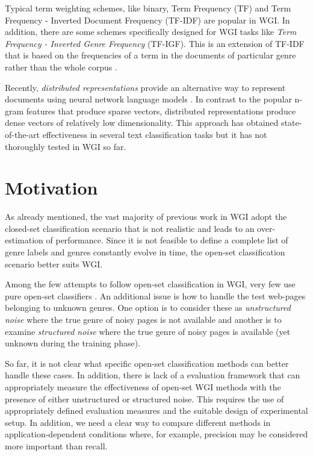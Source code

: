 \begin{itemize}
Typical term weighting schemes, like binary, Term Frequency (TF) and Term Frequency - Inverted Document Frequency (TF-IDF) are popular in WGI. In addition, there are some schemes specifically designed for WGI tasks like  \textit{Term Frequency - Inverted Genre Frequency} (TF-IGF). This is an extension of TF-IDF that is based on the frequencies of a term in the documents of particular genre rather than the whole corpus \parencite{sugiyanto2014term,}.

Recently, \textit{distributed representations} provide an alternative way to represent documents using neural network language models . In contrast to the popular n-gram features that produce sparse vectors, distributed representations produce dense vectors of relatively low dimensionality. This approach has obtained state-of-the-art effectiveness in several text classification tasks but it has not thoroughly tested in WGI so far. 

\section{Motivation} 
\label{chap:introduction:sec:motivation_objective}

As already mentioned, the vast majority of previous work in WGI adopt the closed-set classification scenario that is not realistic and leads to an over-estimation of performance. Since it is not feasible to define a complete list of genre labels and genres constantly evolve in time, the open-set classification scenario better suits WGI. 

Among the few attempts to follow open-set classification in WGI, very few use pure open-set classifiers . An additional issue is how to handle the test web-pages belonging to unknown genres. One option is to consider these as \textit{unstructured noise} where the true genre of noisy pages is not available and another is to examine \textit{structured noise} where the true genre of noisy pages is available (yet unknown during the training phase). 

So far, it is not clear what specific open-set classification methods can better handle these cases. In addition, there is lack of a evaluation framework that can appropriately measure the effectiveness of open-set WGI methods with the presence of either unstructured or structured noise. This requires the use of appropriately defined evaluation measures and the suitable design of experimental setup. In addition, we need a clear way to compare different methods in application-dependent conditions where, for example, precision may be considered more important than recall.


\end{itemize}
